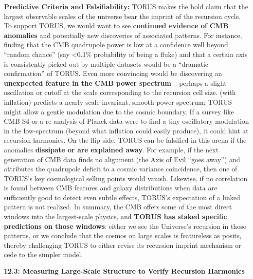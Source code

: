 \documentclass[
]{article}
\begin{document}
\textbf{Predictive Criteria and Falsifiability:} TORUS makes the bold
claim that the largest observable scales of the universe bear the
imprint of the recursion cycle. To support TORUS, we would want to see
\textbf{continued evidence of CMB anomalies} and potentially new
discoveries of associated patterns. For instance, finding that the CMB
quadrupole power is low at a confidence well beyond ``random chance''
(say \textless0.1\% probability of being a fluke) and that a certain
axis is consistently picked out by multiple datasets would be a
``dramatic confirmation'' of TORUS\hspace{0pt}. Even more convincing
would be discovering an \textbf{unexpected feature in the CMB power
spectrum} -- perhaps a slight oscillation or cutoff at the scale
corresponding to the recursion cell size. \LambdaCDM (with inflation) predicts
a nearly scale-invariant, smooth power spectrum; TORUS might allow a
gentle modulation due to the cosmic boundary. If a survey like CMB-S4 or
a re-analysis of Planck data were to find a tiny oscillatory modulation
in the low-\ell spectrum (beyond what inflation could easily produce), it
could hint at recursion harmonics. On the flip side, TORUS can be
falsified in this arena if the anomalies \textbf{dissipate or are
explained away}. For example, if the next generation of CMB data finds
no alignment (the Axis of Evil ``goes away'') and attributes the
quadrupole deficit to a cosmic variance coincidence, then one of TORUS's
key cosmological selling points would vanish. Likewise, if no
correlation is found between CMB features and galaxy distributions when
data are sufficiently good to detect even subtle effects, TORUS's
expectation of a linked pattern is not realized. In summary, the CMB
offers some of the most direct windows into the largest-scale physics,
and \textbf{TORUS has staked specific predictions on those windows}:
either we see the Universe's recursion in those patterns, or we conclude
that the cosmos on large scales is featureless as \LambdaCDM posits, thereby
challenging TORUS to either revise its recursion imprint mechanism or
cede to the simpler model.

\textbf{12.3: Measuring Large-Scale Structure to Verify Recursion
Harmonics}
\end{document}
